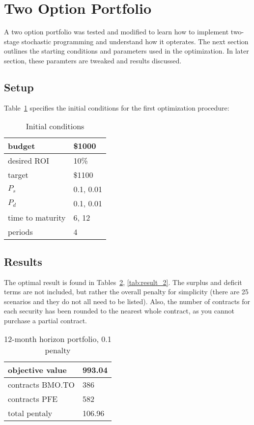 \documentclass[12pt]{article}
\begin{document}
\section{Two Option Portfolio}
A two option portfolio was tested and modified to learn how to implement two-stage stochastic programming and understand how it opterates. The next section outlines the starting conditions and parameters used in the optimization. In later section, these paramters are tweaked and results discussed.

\subsection{Setup}
Table~\ref{tab:init_cond} specifies the initial conditions for the first optimization procedure:
\begin{table}[H]
	\centering
    \begin{tabular}{|l|l|}
    \hline
    	budget & \$1000 \\ \hline
	desired ROI & 10\% \\ \hline
	target & \$1100 \\ \hline
	$P_s$ & 0.1, 0.01 \\ \hline
	$P_d$ & 0.1, 0.01 \\ \hline
	time to maturity & 6, 12 \\ \hline
	periods & 4 \\ \hline
    \end{tabular}
    \caption {Initial conditions}
    \label{tab:init_cond}
\end{table}

\subsection{Results}
The optimal result is found in Tables~\ref{tab:result_1}, \ref{tab:result_2}.
The surplus and deficit terms are not included, but rather the overall penalty for simplicity (there are 25 scenarios and they do not all need to be listed).
Also, the number of contracts for each security has been rounded to the nearest whole contract, as you cannot purchase a partial contract.

\begin{table}[H]
	\centering
    \begin{tabular}{|l|l|}
    \hline
    	objective value & 993.04 \\ \hline
	contracts BMO.TO & 386 \\ \hline
	contracts PFE & 582 \\ \hline
	total pentaly & 106.96 \\ \hline
    \end{tabular}
    \caption {12-month horizon portfolio, 0.1 penalty}
    \label{tab:result_1}
\end{table}
\end{document}
